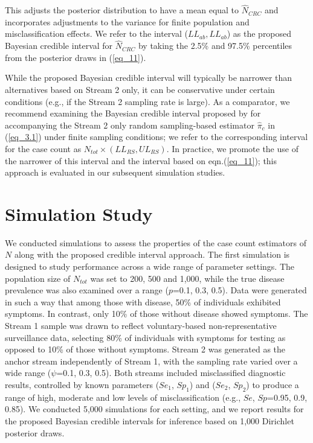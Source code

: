 \documentclass[useAMS,usenatbib,referee]{biom}
\begin{document}
This adjusts the posterior distribution to have a mean equal to $\hat{N}_{CRC}$ and incorporates adjustments to the variance for finite population and misclassification effects. We refer to the interval ($LL_{ab}, LL_{ab}$) as the proposed Bayesian credible interval for $\hat{N}_{CRC}$ by taking the 2.5\% and 97.5\% percentiles from the posterior draws in (\ref{eq_11}).

While the proposed Bayesian credible interval will typically be narrower than alternatives based on Stream 2 only, it can be conservative under certain conditions (e.g., if the Stream 2 sampling rate is large). As a comparator, we recommend examining the Bayesian credible interval proposed by \cite{Ge2023} for accompanying the Stream 2 only random sampling-based estimator $\hat{\pi}_c$ in (\ref{eq_3.1}) under finite sampling conditions; we refer to the corresponding interval for the case count as $N_{tot}\times (LL_{RS}, UL_{RS})$. In practice, we promote the use of the narrower of this interval and the interval based on eqn.(\ref{eq_11}); this approach is evaluated in our subsequent simulation studies. 

\section{Simulation Study}\label{section_3}

We conducted simulations to assess the properties of the case count estimators of $N$ along with the proposed credible interval approach. The first simulation is designed to study performance across a wide range of parameter settings. The population size of $N_{tot}$ was set to 200, 500 and 1,000, while the true disease prevalence was also examined over a range ($p$=0.1, 0.3, 0.5). Data were generated in such a way that among those with disease, 50\% of individuals exhibited symptoms. In contrast, only 10\% of those without disease showed symptoms. The Stream 1 sample was drawn to reflect voluntary-based non-representative surveillance data, selecting 80\% of individuals with symptoms for testing as opposed to 10\% of those without symptoms. Stream 2 was generated as the anchor stream independently of Stream 1, with the sampling rate varied over a wide range ($\psi$=0.1, 0.3, 0.5). Both streams included misclassified diagnostic results, controlled by known parameters ($Se_1$, $Sp_1$) and ($Se_2$, $Sp_2$) to produce a range of high, moderate and low levels of misclassification (e.g., $Se$, $Sp$=0.95, 0.9, 0.85). We conducted 5,000 simulations for each setting, and we report results for the proposed Bayesian credible intervals for inference based on 1,000 Dirichlet posterior draws.   
\end{document}
